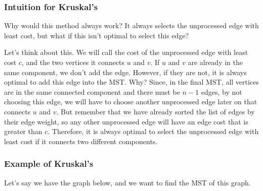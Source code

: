 \documentclass{article}
\begin{document}
\subsubsection{Intuition for Kruskal's}
Why would this method always work? It always selects the unprocessed edge with least cost, but what if this isn't optimal to select this edge?

Let's think about this. We will call the cost of the unprocessed edge with least cost $c$, and the two vertices it connects $u$ and $v$. If $u$ and $v$ are already in the same component, we don't add the edge. However, if they are not, it is always optimal to add this edge into the MST. Why? Since, in the final MST, all vertices are in the same connected component and there must be $n - 1$ edges, by not choosing this edge, we will have to choose another unprocessed edge later on that connects $u$ and $v$. But remember that we have already sorted the list of edges by their edge weight, so any other unprocessed edge will have an edge cost that is greater than $c$. Therefore, it is always optimal to select the unprocessed edge with least cost if it connects two different components.

\subsubsection{Example of Kruskal's}
Let's say we have the graph below, and we want to find the MST of this graph.

\begin{center}
 \end{center}
 
\end{document}
